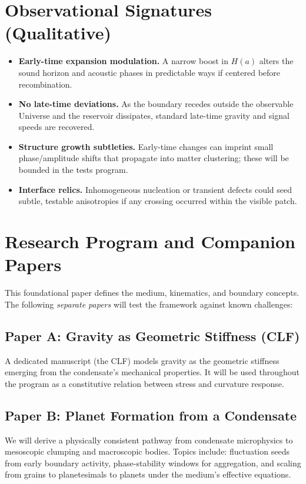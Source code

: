 \documentclass[11pt,a4paper]{article}
\begin{document}
\section{Observational Signatures (Qualitative)}
\begin{itemize}
    \item \textbf{Early-time expansion modulation.} A narrow boost in $H(a)$ alters the sound horizon and acoustic phases in predictable ways if centered before recombination.
    \item \textbf{No late-time deviations.} As the boundary recedes outside the observable Universe and the reservoir dissipates, standard late-time gravity and signal speeds are recovered.
    \item \textbf{Structure growth subtleties.} Early-time changes can imprint small phase/amplitude shifts that propagate into matter clustering; these will be bounded in the tests program.
    \item \textbf{Interface relics.} Inhomogeneous nucleation or transient defects could seed subtle, testable anisotropies if any crossing occurred within the visible patch.
\end{itemize}

\section{Research Program and Companion Papers}
This foundational paper defines the medium, kinematics, and boundary concepts. The following \emph{separate papers} will test the framework against known challenges:

\subsection*{Paper A: Gravity as Geometric Stiffness (CLF)}
A dedicated manuscript (the CLF) models gravity as the geometric stiffness emerging from the condensate's mechanical properties. It will be used throughout the program as a constitutive relation between stress and curvature response.

\subsection*{Paper B: Planet Formation from a Condensate}
We will derive a physically consistent pathway from condensate microphysics to mesoscopic clumping and macroscopic bodies. Topics include: fluctuation seeds from early boundary activity, phase-stability windows for aggregation, and scaling from grains to planetesimals to planets under the medium's effective equations.
\end{document}
